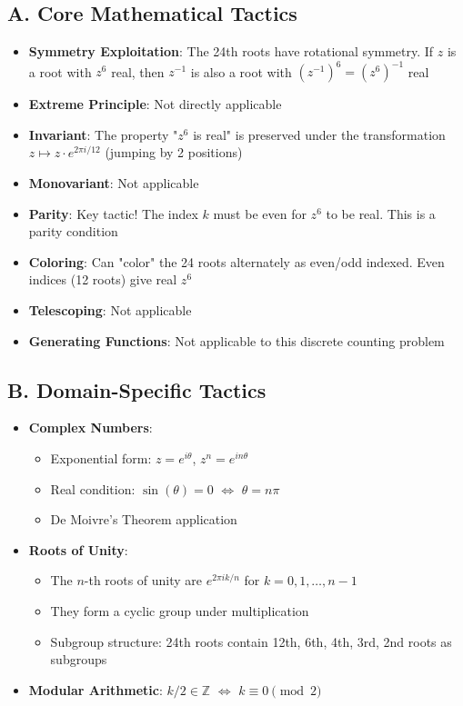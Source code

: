 \documentclass[]{article}
\begin{document}
\begin{tacticalbox}
\subsection*{A. Core Mathematical Tactics}
\begin{itemize}[leftmargin=*]
    \item \textbf{Symmetry Exploitation}: The 24th roots have rotational symmetry. If $z$ is a root with $z^6$ real, then $z^{-1}$ is also a root with $(z^{-1})^6 = (z^6)^{-1}$ real
    \item \textbf{Extreme Principle}: Not directly applicable
    \item \textbf{Invariant}: The property "$z^6$ is real" is preserved under the transformation $z \mapsto z \cdot e^{2\pi i/12}$ (jumping by 2 positions)
    \item \textbf{Monovariant}: Not applicable
    \item \textbf{Parity}: Key tactic! The index $k$ must be even for $z^6$ to be real. This is a parity condition
    \item \textbf{Coloring}: Can "color" the 24 roots alternately as even/odd indexed. Even indices (12 roots) give real $z^6$
    \item \textbf{Telescoping}: Not applicable
    \item \textbf{Generating Functions}: Not applicable to this discrete counting problem
\end{itemize}

\subsection*{B. Domain-Specific Tactics}
\begin{itemize}[leftmargin=*]
    \item \textbf{Complex Numbers}: 
    \begin{itemize}
        \item Exponential form: $z = e^{i\theta}$, $z^n = e^{in\theta}$
        \item Real condition: $\sin(\theta) = 0$ $\Leftrightarrow$ $\theta = n\pi$
        \item De Moivre's Theorem application
    \end{itemize}
    \item \textbf{Roots of Unity}: 
    \begin{itemize}
        \item The $n$-th roots of unity are $e^{2\pi i k/n}$ for $k = 0, 1, \ldots, n-1$
        \item They form a cyclic group under multiplication
        \item Subgroup structure: 24th roots contain 12th, 6th, 4th, 3rd, 2nd roots as subgroups
    \end{itemize}
    \item \textbf{Modular Arithmetic}: $k/2 \in \mathbb{Z}$ $\Leftrightarrow$ $k \equiv 0 \pmod{2}$
\end{itemize}


\end{tacticalbox}
\end{document}
